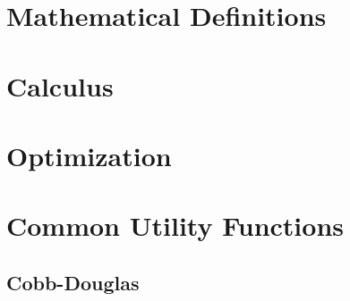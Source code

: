 \documentclass{article}
\begin{document}


\newpage
\appendix
\section{Mathematical Definitions}
\label{sec:math-defin}

 

\newpage

\section{Calculus}
\label{sec:calculus}



\newpage
\section{Optimization}
\label{sec:optimization}



\newpage

\section{Common Utility Functions}
\label{sec:comm-util-funct}

\subsection{Cobb-Douglas}
\label{sec:cobb-douglas}
\end{document}
